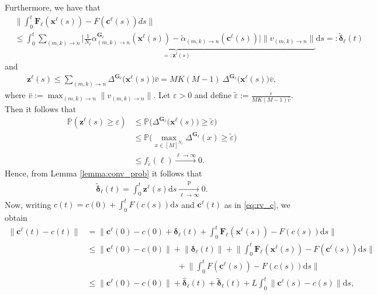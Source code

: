 \documentclass[a4paper,
               10pt,
               pdftex,
               normalheadings,
               headsepline,
               footsepline,
               headinclude,
               footinclude,
               DIV=14,
               abstracton]
{scrartcl}
\newcommand{\Pb}{\mathbb{P}}
\newcommand{\rv}[1]{\bm{#1}}
\newcommand{\toprob}{\overset{\mathrm{p}}{\longrightarrow}}
\newcommand{\diff}{\mathrm{d}}
\begin{document}
Furthermore, we have that
\begin{align}
    &\Big\lVert \int_0^t \rv{F}_{\ell}(\rv{x}^\ell(s)) - F(\rv{c}^\ell(s)) ds \Big\rVert\\
    &\leq \int_0^t \underbrace{
    \sum_{(m,k)\to n} \Big\lvert \frac{1}{N_\ell} \alpha_{(m,k)\to n}^{\rv{G}_\ell}(\rv{x}^\ell(s)) - \tilde{\alpha}_{(m,k)\to n}(\rv{c}^\ell(s)) \Big\rvert \lVert v_{(m,k)\to n} \rVert
    }_{=: \rv{z}^\ell(s)} \diff s =: \rv{\tilde{\delta}}_\ell(t) \label{eq:tilde_delta_def}
\end{align}
and
\begin{align}
    \rv{z}^\ell(s) \leq \sum_{(m,k)\to n} \Delta^{\rv{G}_\ell}\big(\rv{x}^\ell(s)\big) \bar{v} = MK(M-1)\ \Delta^{\rv{G}_\ell}\big(\rv{x}^\ell(s)\big) \bar{v},
\end{align}
where $\bar{v} := \max_{(m,k)\to n} \lVert v_{(m,k)\to n} \rVert$. Let $\varepsilon > 0$ and define $\tilde{\varepsilon} := \frac{\varepsilon}{MK(M-1)\bar{v}}$. Then it follows that
\begin{align}
    \Pb(\rv{z}^\ell(s) \geq \varepsilon) &\leq \Pb\Big(\Delta^{\rv{G}_\ell}\big(\rv{x}^\ell(s)\big) \geq \tilde{\varepsilon}\Big)\\
    &\leq \Pb \Big(\max_{x \in [M]^{N_\ell}} \Delta^{\rv{G}_\ell}(x) \geq \tilde{\varepsilon}\Big)\\
    &\leq f_{\tilde{\varepsilon}}(\ell) \overset{\ell \to \infty}{\longrightarrow} 0.
\end{align}
Hence, from Lemma \ref{lemma:conv_prob} it follows that
\begin{align}
    \rv{\tilde{\delta}}_\ell(t) = \int_0^t \rv{z}^\ell(s) \diff s \underset{\ell  \to \infty}{\toprob}0.
    \label{eq:delta_tilde_conv}
\end{align}
Now, writing $c(t) = c(0) + \int_0^t F(c(s)) \diff s$ and $\rv{c}^\ell(t)$ as in \eqref{eq:rv_c}, we obtain
\begin{align}
    \lVert \rv{c}^\ell(t) - c(t) \rVert &= \Big\lVert \rv{c}^\ell(0) - c(0) +  \rv{\delta}_\ell(t) + \int_0^t \rv{F}_{\ell}(\rv{x}^\ell(s)) - F(c(s)) \diff s \Big\rVert\\
    &\leq \lVert \rv{c}^\ell(0) - c(0) \rVert + \lVert \rv{\delta}_\ell(t) \rVert + \Big\lVert \int_0^t \rv{F}_{\ell}(\rv{x}^\ell(s)) - F(\rv{c}^\ell(s)) \diff s \Big\rVert\\
    &\qquad\qquad\qquad\qquad\qquad\quad+ \Big\lVert \int_0^t F(\rv{c}^\ell(s)) - F(c(s)) \diff s \Big\rVert \nonumber\\
    & \leq \lVert \rv{c}^\ell(0) - c(0) \rVert + \hat{\rv{\delta}}_\ell(t) + \rv{\tilde{\delta}}_\ell(t) + L \int_0^t \rVert \rv{c}^\ell(s) - c(s) \rVert \diff s,
\end{align}
\end{document}

